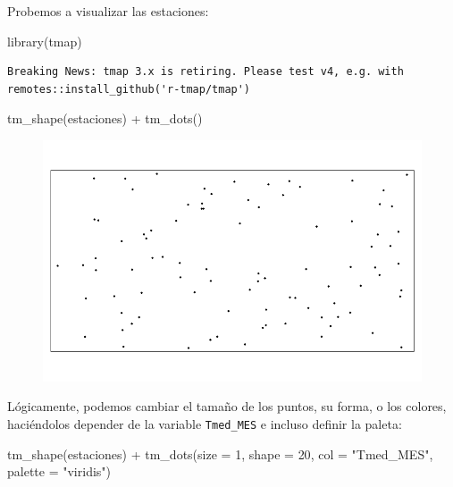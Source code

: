 \documentclass[
  letterpaper,
  DIV=11,
  numbers=noendperiod]{scrreprt}
\newenvironment{Shaded}{\begin{snugshade}}{\end{snugshade}}
\newcommand{\AttributeTok}[1]{\textcolor[rgb]{0.40,0.45,0.13}{#1}}
\newcommand{\DecValTok}[1]{\textcolor[rgb]{0.68,0.00,0.00}{#1}}
\newcommand{\FunctionTok}[1]{\textcolor[rgb]{0.28,0.35,0.67}{#1}}
\newcommand{\NormalTok}[1]{\textcolor[rgb]{0.00,0.23,0.31}{#1}}
\newcommand{\SpecialCharTok}[1]{\textcolor[rgb]{0.37,0.37,0.37}{#1}}
\newcommand{\StringTok}[1]{\textcolor[rgb]{0.13,0.47,0.30}{#1}}
\begin{document}
Probemos a visualizar las estaciones:

\begin{Shaded}
\begin{Highlighting}[]
\FunctionTok{library}\NormalTok{(tmap)}
\end{Highlighting}
\end{Shaded}

\begin{verbatim}
Breaking News: tmap 3.x is retiring. Please test v4, e.g. with
remotes::install_github('r-tmap/tmap')
\end{verbatim}

\begin{Shaded}
\begin{Highlighting}[]
\FunctionTok{tm\_shape}\NormalTok{(estaciones) }\SpecialCharTok{+}
    \FunctionTok{tm\_dots}\NormalTok{()}
\end{Highlighting}
\end{Shaded}

\begin{figure}[H]

{\centering \includegraphics{03_DatosEspaciales_files/figure-pdf/unnamed-chunk-13-1.pdf}

}

\end{figure}

Lógicamente, podemos cambiar el tamaño de los puntos, su forma, o los
colores, haciéndolos depender de la variable \texttt{Tmed\_MES} e
incluso definir la paleta:

\begin{Shaded}
\begin{Highlighting}[]
\FunctionTok{tm\_shape}\NormalTok{(estaciones) }\SpecialCharTok{+}
    \FunctionTok{tm\_dots}\NormalTok{(}\AttributeTok{size =} \DecValTok{1}\NormalTok{, }\AttributeTok{shape =} \DecValTok{20}\NormalTok{, }\AttributeTok{col =} \StringTok{"Tmed\_MES"}\NormalTok{, }\AttributeTok{palette =} \StringTok{"viridis"}\NormalTok{)}
\end{Highlighting}
\end{Shaded}
\end{document}
